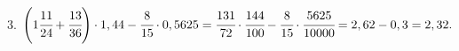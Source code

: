 3. $\left(1\cfrac{11}{24}+\cfrac{13}{36}\right)\cdot1,44-\cfrac{8}{15}\cdot0,5625=\cfrac{131}{72}\cdot\cfrac{144}{100}-\cfrac{8}{15}\cdot\cfrac{5625}{10000}=
2,62-0,3=2,32.$\\
